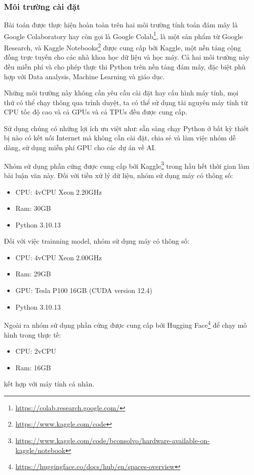 \subsubsection{Môi trường cài đặt}
Bài toán được thực hiện hoàn toàn trên hai môi trường tính toán đám mây là Google Colaboratory hay còn gọi là Google Colab\footnote{\url{https://colab.research.google.com/}}, là một sản phẩm từ Google Research, và Kaggle Notebooks\footnote{\url{https://www.kaggle.com/code}} được cung cấp bởi Kaggle, một nền tảng cộng đồng trực tuyến cho các nhà khoa học dữ liệu và học máy. Cả hai môi trường này đều miễn phí và cho phép thực thi Python trên nền tảng đám mây, đặc biệt phù hợp với Data analysis, Machine Learning và giáo dục.

Những môi trường này không cần yêu cầu cài đặt hay cấu hình máy tính, mọi thứ có thể chạy thông qua trình duyệt, ta có thể sử dụng tài nguyên máy tính từ CPU tốc độ cao và cả GPUs và cả TPUs đều được cung cấp.

Sử dụng chúng có những lợi ích ưu việt như: sẵn sàng chạy Python ở bất kỳ thiết bị nào có kết nối Internet mà không cần cài đặt, chia sẻ và làm việc nhóm dễ dàng, sử dụng miễn phí GPU cho các dự án về AI\cite{webpage15}.

Nhóm sử dụng phần cứng được cung cấp bởi Kaggle\footnote{\url{https://www.kaggle.com/code/bconsolvo/hardware-available-on-kaggle/notebook}} trong hầu hết thời gian làm bài luận văn này. Đối với tiền xử lý dữ liệu, nhóm sử dụng máy có thông số:
\begin{itemize}
    \item CPU: 4vCPU Xeon 2.20GHz
    \item Ram: 30GB
    \item Python 3.10.13
\end{itemize}
Đối với việc trainning model, nhóm sử dụng máy có thông số:
\begin{itemize}
    \item CPU: 4vCPU Xeon 2.00GHz
    \item Ram: 29GB
    \item GPU: Tesla P100 16GB (CUDA version 12.4)
    \item Python 3.10.13
\end{itemize}
Ngoài ra nhóm sử dụng phần cứng được cung cấp bởi Hugging Face\footnote{\url{https://huggingface.co/docs/hub/en/spaces-overview}} để chạy mô hình trong thực tế:
\begin{itemize}
    \item CPU: 2vCPU
    \item Ram: 16GB
\end{itemize}
kết hợp với máy tính cá nhân.

